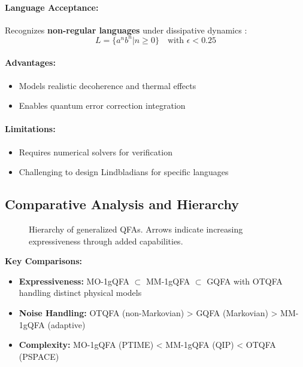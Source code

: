 \paragraph{Language Acceptance:}
Recognizes \textbf{non-regular languages} under dissipative dynamics \cite{hirvensalo2012quantum}:
\[
L = \{a^nb^n | n \geq 0\} \quad \text{with } \epsilon < 0.25 
\]
\cite{hirvensalo2012quantum}

\paragraph{Advantages:}
\begin{itemize}
    \item Models realistic decoherence and thermal effects
    \item Enables quantum error correction integration
\end{itemize}

\paragraph{Limitations:}
\begin{itemize}
    \item Requires numerical solvers for verification
    \item Challenging to design Lindbladians for specific languages
\end{itemize}

\subsection*{Comparative Analysis and Hierarchy}
\begin{figure}[h]
\centering
{}
\caption{Hierarchy of generalized QFAs. Arrows indicate increasing expressiveness through added capabilities.}
\label{fig:gqfa-hierarchy}
\end{figure}

\textbf{Key Comparisons:}
\begin{itemize}
    \item \textbf{Expressiveness:} MO-1gQFA $\subset$ MM-1gQFA $\subset$ GQFA with OTQFA handling distinct physical models
    \item \textbf{Noise Handling:} OTQFA (non-Markovian) > GQFA (Markovian) > MM-1gQFA (adaptive)
    \item \textbf{Complexity:} MO-1gQFA (PTIME) < MM-1gQFA (QIP) < OTQFA (PSPACE)
\end{itemize}